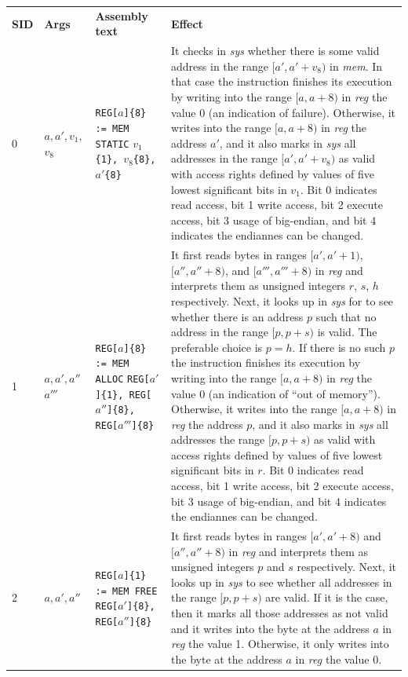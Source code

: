 \documentclass[10pt,twocolumn]{article}
\begin{document}
\begin{table}[!h]
\begin{center}
\def\arraystretch{1.5}
\begin{tabular}{lp{1.2cm}p{5.5cm}p{7.5cm}}
\textbf{SID} & \textbf{Args} & \textbf{Assembly text} & \textbf{Effect}
\\

0 & $ a, a', v_1, $ \newline  $ v_8 $ %
& \texttt{REG[}$ a $\texttt{]\{8\} := MEM STATIC} $ v_1 $\texttt{\{1\}, }$ v_8
$\texttt{\{8\}, }$ a' $\texttt{\{8\}} %
& It checks in \textit{sys} whether there is some valid address in the range $
[a',a'+v_8) $ in \textit{mem}. In that case the instruction finishes its
execution by writing into the range $ [a,a+8) $ in \textit{reg} the value 0 (an
indication of failure). Otherwise, it writes into the range $ [a,a+8) $ in
\textit{reg} the address $ a' $, and it also marks in \textit{sys} all addresses
in the range $ [a',a'+v_8) $ as valid with access rights defined by values of
five lowest significant bits in $ v_1 $. Bit 0 indicates read access, bit 1
write access, bit 2 execute access, bit 3 usage of big-endian, and bit 4
indicates the endiannes can be changed. \\

1 & $ a, a', a''$ \newline  $ a''' $ %
& \texttt{REG[}$ a $\texttt{]\{8\} := MEM ALLOC} \texttt{REG[}$ a'
$\texttt{]\{1\}, REG[}$ a'' $\texttt{]\{8\}, REG[}$ a''' $\texttt{]\{8\}} %
& It first reads bytes in ranges $ [a',a'+1) $, $ [a'',a''+8) $, and $
[a''',a'''+8) $ in \textit{reg} and interprets them as unsigned integers $ r $,
$ s $, $ h $ respectively. Next, it looks up in \textit{sys} for to see whether
there is an address $ p $ such that no address in the range $ [p,p+s) $ is
valid. The preferable choice is $ p = h $. If there is no such $ p $ the
instruction finishes its execution by writing into the range $ [a,a+8) $ in
\textit{reg} the value 0 (an indication of ``out of memory''). Otherwise, it
writes into the range $ [a,a+8) $ in \textit{reg} the address $ p $, and it also
marks in \textit{sys} all addresses the range $ [p,p+s) $ as valid with access
rights defined by values of five lowest significant bits in $ r $. Bit 0
indicates read access, bit 1 write access, bit 2 execute access, bit 3 usage of
big-endian, and bit 4 indicates the endiannes can be changed. \\

2 & $ a,a',a'' $ %
& \texttt{REG[}$ a $\texttt{]\{1\} := MEM FREE REG[}$ a' $\texttt{]\{8\},
REG[}$ a'' $\texttt{]\{8\}} %
& It first reads bytes in ranges $ [a',a'+8) $ and $ [a'',a''+8) $ in
\textit{reg} and interprets them as unsigned integers $ p $ and $ s $
respectively. Next, it looks up in \textit{sys} to see whether all addresses in
the range $ [p,p+s) $ are valid. If it is the case, then it marks all those
addresses as not valid and it writes into the byte at the address $ a $ in
\textit{reg} the value 1. Otherwise, it only writes into the byte at the address
$ a $ in \textit{reg} the value 0.
\\


\end{tabular}
\end{center}
\end{table}
\end{document}
